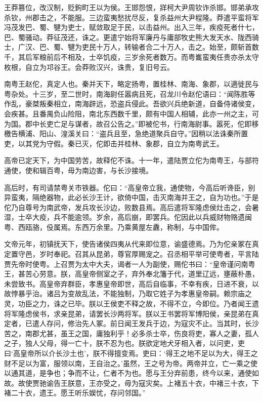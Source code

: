 \documentclass[12pt,UTF8]{ctexbook}
\begin{document}
王莽篡位，改汉制，贬鉤町王以为侯。王邯怨恨，牂柯大尹周钦诈杀邯。邯弟承攻杀钦，州郡击之，不能服。三边蛮夷愁扰尽反，复杀益州大尹程隆。莽遣平蛮将军冯茂发巴、蜀、犍为吏士，赋敛取足于民，以击益州。出入三年，疾疫死者什七，巴、蜀骚动。莽征茂还，诛之。更遣宁始将军廉丹与庸部牧史熊大发天水、陇西骑士，广汉、巴、蜀、犍为吏民十万人，转输者合二十万人，击之。始至，颇斩首数千，其后军粮前后不相及，士卒饥疫，三岁余死者数万。而粤巂蛮夷任贵亦杀太守枚根，自立为邛谷王。会莽败汉兴，诛贵，复旧号云。



南粤王赵佗，真定人也。秦并天下，略定扬粤，置桂林、南海、象郡，以適徙民与粤杂处。十三岁，至二世时，南海尉任嚣病且死，召龙川令赵佗语曰：“闻陈胜等作乱，豪桀叛秦相立，南海辟远，恐盗兵侵此。吾欲兴兵绝新道，自备侍诸侯变，会疾甚。且番禺负山险阻，南北东西数千里，颇有中国人相辅，此亦一州之主，可为国。郡中长吏亡足与谋者，故召公告之。”即被佗书，行南海尉事。嚣死，佗即移檄告横浦、阳山、湟溪关曰：“盗兵且至，急绝道聚兵自守。”因稍以法诛秦所置吏，以其党为守假。秦已灭，佗即击并桂林、象郡，自立为南粤武王。



高帝已定天下，为中国劳苦，故释佗不诛。十一年，遣陆贾立佗为南粤王，与部符通使，使和辑百粤，毋为南边害，与长沙接境。



高后时，有司请禁粤关市铁器。佗曰：“高皇帝立我，通使物，今高后听谗臣，别异蛮夷，隔绝器物，此必长沙王计，欲倚中国，击灭南海并王之，自为功也。”于是佗乃自尊号为南武帝，发兵攻长沙边，败数县焉。高后遣将军隆虑侯灶击之，会暑湿，士卒大疫，兵不能逾领。岁余，高后崩，即罢兵。佗因此以兵威财物赂遗闽粤、西瓯骆，伇属焉。东西万余里。乃乘黄屋左纛，称制，与中国侔。



文帝元年，初镇抚天下，使告诸侯四夷从代来即位意，谕盛德焉。乃为佗亲冢在真定置守邑，岁时奉祀。召其从昆弟，尊官厚赐宠之。召丞相平举可使粤者，平言陆贾先帝时使粤。上召贾为太中大夫，谒者一人为副使，赐佗书曰：“皇帝谨问南粤王，甚苦心劳意。朕，高皇帝侧室之子，弃外奉北籓于代，道里辽远，壅蔽朴愚，未尝致书。高皇帝弃群臣，孝惠皇帝即世，高后自临事，不幸有疾，日进不衰，以故悖暴乎治。诸吕为变故乱法，不能独制，乃取它姓子为孝惠皇帝嗣。赖宗庙之灵，功臣之力，诛之已毕。朕以王侯吏不释之故，不得不立，今即位。乃者闻王遗将军隆虑侯书，求亲昆弟，请罢长沙两将军。朕以王书罢将军博阳侯，亲昆弟在真定者，已遣人存问，修治先人冢。前日闻王发兵于边，为寇灾不止。当其时，长沙苦之，南郡尤甚，虽王之国，庸独利乎！必多杀士卒，伤良将吏，寡人之妻，孤人之子，独人父母，得一亡十，朕不忍为也。朕欲定地犬牙相入者，以问吏，吏曰‘高皇帝所以介长沙土也’，朕不得擅变焉。吏曰：‘得王之地不足以为大，得王之财不足以为富，服领以南，王自治之。’虽然，王之号为帝。两帝并立，亡一乘之使以通其道，是争也；争而不让，仁者不为也。愿与王分弃前患，终今以来，通使如故。故使贾驰谕告王朕意，王亦受之，毋为寇灾矣。上褚五十衣，中褚三十衣，下褚二十衣，遗王。愿王听乐娱忧，存问邻国。”
\end{document}
